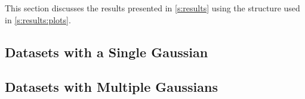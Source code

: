This section discusses the results presented in \cref{s:results} using the structure used in \cref{s:results:plots}.

\subsection{Datasets with a Single Gaussian}
	\label{s:discussion:singleGaussian}
	


\subsection{Datasets with Multiple Gaussians}
	\label{s:discussion:multipleGaussians}
	

